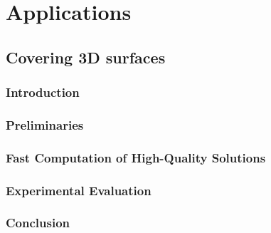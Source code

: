 
\chapter{Applications}
\thispagestyle{myheadings}

\section{Covering 3D surfaces}

\def\spoc{{\texttt{{SPOC}}}\xspace}
\def\osg{{\texttt{{OSG}}}\xspace}

\subsection{Introduction}

\label{sec:surf-intro}

\subsection{Preliminaries}\label{sec:surf-preliminary}



%

\subsection{Fast Computation of High-Quality Solutions}\label{sec:surf-algorithm}


\subsection{Experimental Evaluation}\label{sec:surf-evaluation}


\vspace{-1mm}
\subsection{Conclusion}\label{sec:surf-conclusion}


